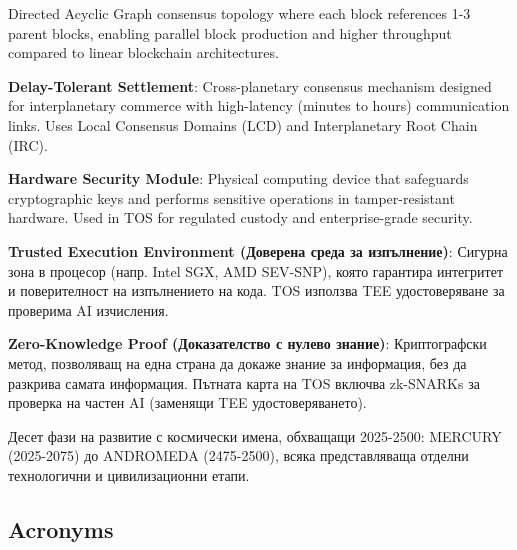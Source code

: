 \documentclass[11pt]{article}
\begin{document}
\begin{description}[leftmargin=3cm, style=nextline]
  \item[BlockDAG] Directed Acyclic Graph consensus topology where each block references 1-3 parent blocks, enabling parallel block production and higher throughput compared to linear blockchain architectures.

  \item[DT-Settlement] \textbf{Delay-Tolerant Settlement}: Cross-planetary consensus mechanism designed for interplanetary commerce with high-latency (minutes to hours) communication links. Uses Local Consensus Domains (LCD) and Interplanetary Root Chain (IRC).

  \item[HSM] \textbf{Hardware Security Module}: Physical computing device that safeguards cryptographic keys and performs sensitive operations in tamper-resistant hardware. Used in TOS for regulated custody and enterprise-grade security.

  \item[TEE] \textbf{Trusted Execution Environment (Доверена среда за изпълнение)}: Сигурна зона в процесор (напр. Intel SGX, AMD SEV-SNP), която гарантира интегритет и поверителност на изпълнението на кода. TOS използва TEE удостоверяване за проверима AI изчисления.

  \item[ZK Proof] \textbf{Zero-Knowledge Proof (Доказателство с нулево знание)}: Криптографски метод, позволяващ на една страна да докаже знание за информация, без да разкрива самата информация. Пътната карта на TOS включва zk-SNARKs за проверка на частен AI (заменящи TEE удостоверяването).

  \item[Celestial Eras (Небесни ери)] Десет фази на развитие с космически имена, обхващащи 2025-2500: MERCURY (2025-2075) до ANDROMEDA (2475-2500), всяка представляваща отделни технологични и цивилизационни етапи.
\end{description}

\subsection*{Acronyms}
\end{document}
